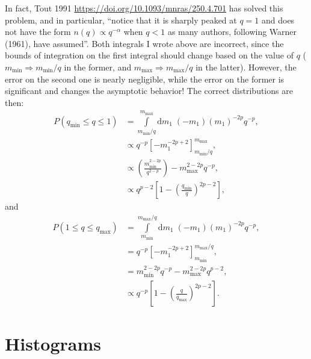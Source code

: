 \documentclass[11pt,
        usenames, %
        dvipsnames %
    ]{article}
\newcommand*{\p}[1]{\left(#1\right)}
\newcommand*{\s}[1]{\left[#1\right]}
\begin{document}
In fact, Tout 1991 \url{https://doi.org/10.1093/mnras/250.4.701} has solved this
problem, and in particular, ``notice that it is sharply peaked at $q = 1$ and
does not have the form $n(q) \propto q^{-\alpha}$ when $q < 1$ as many authors,
following Warner (1961), have assumed''. Both integrals I wrote above are
incorrect, since the bounds of integration on the first integral should change
based on the value of $q$ ($m_{\min} \Rightarrow m_{\min} / q$ in the former,
and $m_{\max} \Rightarrow m_{\max} / q$ in the latter). However, the error on
the second one is nearly negligible, while the error on the former is
significant and changes the asymptotic behavior! The correct distributions are
then:
\begin{align}
    P\p{q_{\min} \leq q \leq 1} &= \int\limits_{m_{\min} / q}^{m_{\max}}
            \mathrm{d}m_1\; (-m_1) \p{m_1}^{-2p}q^{-p},\\
        &\propto q^{-p}\s{-m_1^{-2p + 2}}_{m_{\min} / q}^{m_{\max}},\\
        &\propto \p{\frac{m_{\min}^{2 - 2p}}{q^{2 - p}}}
            - m_{\max}^{2 - 2p}q^{-p},\\
        &\propto q^{p - 2}\s{1 - \p{\frac{q_{\min}}{q}}^{2p -
        2}},\label{eq:salpeter_1}
\end{align}
and
\begin{align}
    P\p{1 \leq q \leq q_{\max}} &= \int\limits_{m_{\min}}^{m_{\max} / q}
            \mathrm{d}m_1\; (-m_1) \p{m_1}^{-2p}q^{-p},\\
        &= q^{-p}\s{-m_1^{-2p + 2}}_{m_{\min}}^{m_{\max} / q},\\
        &= m_{\min}^{2 - 2p}q^{-p} - m_{\max}^{2 - 2p}q^{p - 2},\\
        &\propto q^{-p}\s{1 - \p{\frac{q}{q_{\max}}}^{2p -
        2}}.\label{eq:salpeter_2}
\end{align}

\section{Histograms}
\end{document}
